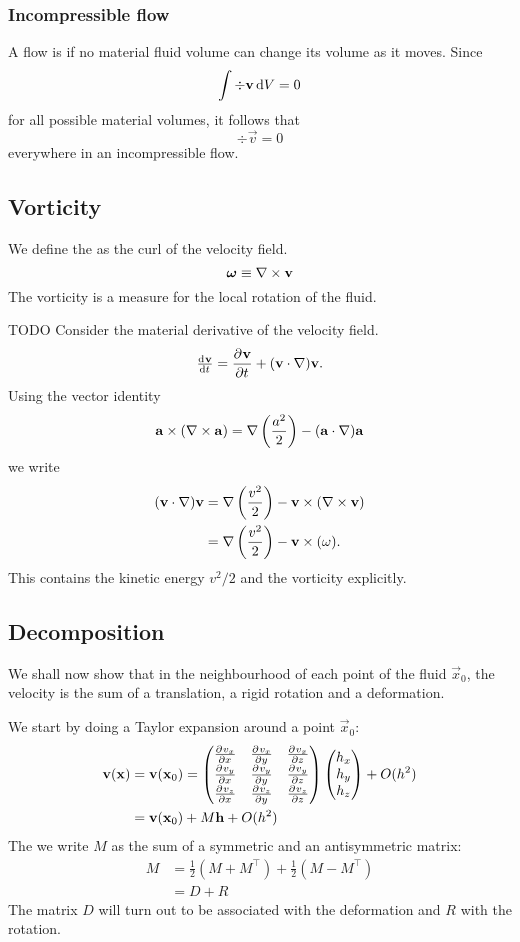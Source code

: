 \subsubsection{Incompressible flow}
A flow is  if no material fluid volume can change its volume as it moves. Since
\[ \int \div \boldsymbol{\mathrm{v}} \operatorname{d \!}{V} = 0 \]
for all possible material volumes, it follows that
\[ \div \vec{v} = 0 \]
everywhere in an incompressible flow.

\subsection{Vorticity}
We define the  as the curl of the velocity field.
\[ \boldsymbol{\mathrm{\omega}} \equiv \mathop{}\! \nabla\times \boldsymbol{\mathrm{v}} \]
The vorticity is a measure for the local rotation of the fluid.


TODO
Consider the material derivative of the velocity field.
\[\od{\vec{v}}{t} = \pd{\vec{v}}{t} + (\vec{v}\cdot\nabla)\vec{v}.\]
Using the vector identity
\[ \boldsymbol{\mathrm{a}}\times (\mathop{}\! \nabla\times \boldsymbol{\mathrm{a}}) = \mathop{}\! \nabla \left(\frac{a^2}{2}\right) - (\boldsymbol{\mathrm{a}}\cdot \nabla)\boldsymbol{\mathrm{a}} \]
we write
\begin{align*}
(\boldsymbol{\mathrm{v}}\cdot \nabla)\boldsymbol{\mathrm{v}} &= \nabla \left(\frac{v^2}{2}\right) - \boldsymbol{\mathrm{v}}\times(\mathop{}\! \nabla\times \boldsymbol{\mathrm{v}}) \\
&= \nabla \left(\frac{v^2}{2}\right) - \boldsymbol{\mathrm{v}}\times(\omega).
\end{align*}
This contains the kinetic energy $v^2/2$ and the vorticity explicitly.

\subsection{Decomposition}
We shall now show that in the neighbourhood of each point of the fluid $\vec{x}_0$, the velocity is the sum of a translation, a rigid rotation and a deformation.

We start by doing a Taylor expansion around a point $\vec{x}_0$:
\begin{align*}
\boldsymbol{\mathrm{v}}(\boldsymbol{\mathrm{x}}) &= \boldsymbol{\mathrm{v}}(\boldsymbol{\mathrm{x}}_0) = \begin{pmatrix}
 \frac{\partial{^{}}v_x}{\partial{{x}^{}}}  &  \frac{\partial{^{}}v_x}{\partial{{y}^{}}}  &  \frac{\partial{^{}}v_x}{\partial{{z}^{}}}  \\
 \frac{\partial{^{}}v_y}{\partial{{x}^{}}}  &  \frac{\partial{^{}}v_y}{\partial{{y}^{}}}  &  \frac{\partial{^{}}v_y}{\partial{{z}^{}}}  \\
 \frac{\partial{^{}}v_z}{\partial{{x}^{}}}  &  \frac{\partial{^{}}v_z}{\partial{{y}^{}}}  &  \frac{\partial{^{}}v_z}{\partial{{z}^{}}} 
\end{pmatrix}\begin{pmatrix}
h_x \\ h_y \\ h_z
\end{pmatrix} + O(h^2) \\
&= \boldsymbol{\mathrm{v}}(\boldsymbol{\mathrm{x}}_0) + M \boldsymbol{\mathrm{h}} + O(h^2)
\end{align*}
The we write $M$ as the sum of a symmetric and an antisymmetric matrix:
\begin{align*}
M &= \frac{1}{2}(M+M^\intercal) + \frac{1}{2}(M-M^\intercal) \\
&= D+R
\end{align*}
The matrix $D$ will turn out to be associated with the deformation and $R$ with the rotation.


